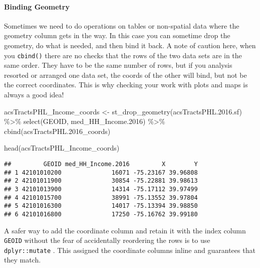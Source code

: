 \documentclass[
]{article}
\newenvironment{Shaded}{\begin{snugshade}}{\end{snugshade}}
\newcommand{\FloatTok}[1]{\textcolor[rgb]{0.00,0.00,0.81}{#1}}
\newcommand{\FunctionTok}[1]{\textcolor[rgb]{0.00,0.00,0.00}{#1}}
\newcommand{\NormalTok}[1]{#1}
\newcommand{\OtherTok}[1]{\textcolor[rgb]{0.56,0.35,0.01}{#1}}
\newcommand{\SpecialCharTok}[1]{\textcolor[rgb]{0.00,0.00,0.00}{#1}}
\begin{document}
\hypertarget{binding-geometry}{%
\paragraph{Binding Geometry}\label{binding-geometry}}

Sometimes we need to do operations on tables or non-spatial data where
the geometry column gets in the way. In this case you can sometime drop
the geometry, do what is needed, and then bind it back. A note of
caution here, when you \texttt{cbind()} there are no checks that the
rows of the two data sets are in the same order. They have to be the
same number of rows, but if you analysis resorted or arranged one data
set, the coords of the other will bind, but not be the correct
coordinates. This is why checking your work with plots and maps is
always a good idea!

\begin{Shaded}
\begin{Highlighting}[]
\NormalTok{acsTractsPHL\_Income\_coords }\OtherTok{\textless{}{-}} \FunctionTok{st\_drop\_geometry}\NormalTok{(acsTractsPHL.}\FloatTok{2016.}\NormalTok{sf) }\SpecialCharTok{\%\textgreater{}\%} 
  \FunctionTok{select}\NormalTok{(GEOID, med\_HH\_Income}\FloatTok{.2016}\NormalTok{) }\SpecialCharTok{\%\textgreater{}\%} 
  \FunctionTok{cbind}\NormalTok{(acsTractsPHL}\FloatTok{.2016}\NormalTok{\_coords)}

\FunctionTok{head}\NormalTok{(acsTractsPHL\_Income\_coords)}
\end{Highlighting}
\end{Shaded}

\begin{verbatim}
##         GEOID med_HH_Income.2016         X        Y
## 1 42101010200              16071 -75.23167 39.96808
## 2 42101011900              30854 -75.22881 39.98613
## 3 42101013900              14314 -75.17112 39.97499
## 4 42101015700              38991 -75.13552 39.97804
## 5 42101016300              14017 -75.13394 39.98850
## 6 42101016800              17250 -75.16762 39.99180
\end{verbatim}

A safer way to add the coordinate column and retain it with the index
column \texttt{GEOID} without the fear of accidentally reordering the
rows is to use \texttt{dplyr::mutate} . This assigned the coordinate
columns inline and guarantees that they match.
\end{document}
